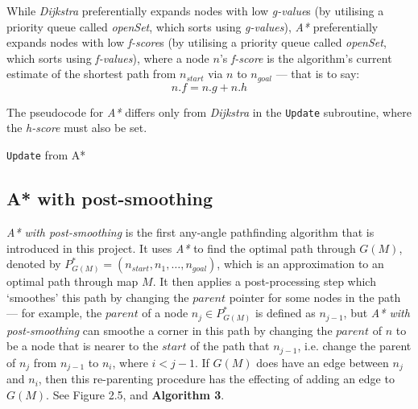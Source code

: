 \documentclass[12pt,notitlepage]{report}
\begin{document}
\noindent
While {\em Dijkstra} preferentially expands nodes with low {\em g-value}s (by utilising a priority queue called {\em openSet}, which sorts using {\em g-values}), {\em A*} preferentially expands nodes with low {\em f-score}s (by utilising a priority queue called {\em openSet}, which sorts using {\em f-values}), where a node $n$'s {\em f-score} is the algorithm's current estimate of the shortest path from $n_{start}$ via $n$ to $n_{goal}$ --- that is to say:
\begin{equation}
n.f = n.g + n.h
\end{equation}

\noindent
The pseudocode for {\em A*} differs only from {\em Dijkstra} in the {\tt Update} subroutine, where the {\em h-score} must also be set.

\begin{algorithm}
  \SetAlgoLined\DontPrintSemicolon
  \caption{{\tt Update} from {\sc A*}}
\end{algorithm} 

\subsection {A* with post-smoothing}

{\em A* with post-smoothing} is the first any-angle pathfinding algorithm that is introduced in this project. It uses {\em A*} to find the optimal path through $G(M)$, denoted by $P^{*}_{G(M)} = (n_{start}, n_{1}, \ldots, n_{goal})$, which is an approximation to an optimal path through map $M$. It then applies a post-processing step which `smoothes' this path by changing the $parent$ pointer for some nodes in the path --- for example, the $parent$ of a node $n_{j} \in P^{*}_{G(M)}$ is defined as $n_{j-1}$, but {\em A* with post-smoothing} can smoothe a corner in this path by changing the $parent$ of  $n$ to be a node that is nearer to the $start$ of the path that $n_{j-1}$, i.e. change the parent of $n_{j}$ from $n_{j-1}$ to $n_{i}$, where $i<j-1$. If $G(M)$ does have an edge between $n_{j}$ and $n_{i}$, then this re-parenting procedure has the effecting of adding an edge to $G(M)$. See Figure 2.5, and {\bfseries Algorithm 3}.\\
\end{document}
